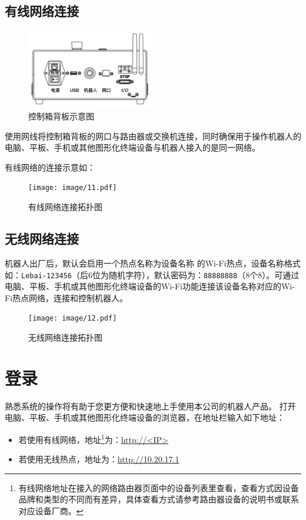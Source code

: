 \subsection{有线网络连接}

\begin{figure}[ht]
    \centering
    \includegraphics[height=3.5cm]{image/41.pdf}
    \caption{控制箱背板示意图}
    \label{fig:控制箱背板示意图}
\end{figure}

使用网线将控制箱背板的网口与路由器或交换机连接，同时确保用于操作机器人的电脑、平板、手机或其他图形化终端设备与机器人接入的是同一网络。

有线网络的连接示意如：

\begin{figure}[ht]
    \centering
    \texttt{[image: image/11.pdf]}
    \caption{有线网络连接拓扑图}
    \label{fig:有线网络连接拓扑图}
\end{figure}

\subsection{无线网络连接}
机器人出厂后，默认会启用一个热点名称为设备名称  的Wi-Fi热点，设备名称格式如：\verb|Lebai-123456|（后6位为随机字符），默认密码为：\verb|88888888|（8个8）。可通过电脑、平板、手机或其他图形化终端设备的Wi-Fi功能连接该设备名称对应的Wi-Fi热点网络，连接和控制机器人。

\begin{figure}[ht]
    \centering
    \texttt{[image: image/12.pdf]}
    \caption{无线网络连接拓扑图}
    \label{fig:无线网络连接拓扑图}
\end{figure}

\section{登录\LM}
熟悉\LM 系统的操作将有助于您更方便和快速地上手使用本公司的机器人产品。
打开电脑、平板、手机或其他图形化终端设备的浏览器，在地址栏输入如下地址：
\begin{itemize}
	\item 若使用有线网络，地址\footnote{有线网络地址在接入的网络路由器页面中的设备列表里查看，查看方式因设备品牌和类型的不同而有差异，具体查看方式请参考路由器设备的说明书或联系对应设备厂商。}为：\url{http://<IP>}
	\item 若使用无线热点，地址为：\url{http://10.20.17.1}
\end{itemize}

